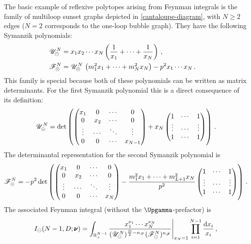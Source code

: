 \documentclass[12pt,a4paper]{article}
\theoremstyle{plain}
\theoremstyle{remark}
\newcommand{\fp}{x}
\newcommand{\nprops}{N}
\newcommand{\dd}{\mathrm{d}}
\newcommand{\cU}{\mathscr {U}}
\newcommand{\cF}{\mathscr {F}}
\newcommand{\undernotation}[1]{\pmb{#1}}
\begin{document}
		
		The basic example of reflexive polytopes arising from
        Feynman integrals is the family of multiloop sunset graphs
        depicted in \cref{cantaloupe-diagram}, with $\nprops \ge 2$ edges ($\nprops=2$ corresponds to the one-loop bubble graph).
        They have the following Symanzik polynomials:
		\begin{align}
			\cU^{\nprops}_{\circleddash}&=\fp_1 \fp_2 \cdots \fp_{\nprops} \left(\frac {1}{\fp_1}+\dots + \frac {1}{\fp_{\nprops}}\right)\, ,\cr
			\cF^{\nprops}_{\circleddash}&= 	\cU^{\nprops}_{\circleddash}\,\left(m_1^2 \fp_1 + \dots + m_{\nprops}^2 \fp_{\nprops} \right) - p^2\fp_1 \cdots \fp_{\nprops}\,.\label{secondSymanzik-banana}
		\end{align}
%
This family is special because both of these polynomials can be written as matrix determinants.
For the first Symanzik polynomial this is a direct
consequence of its definition:
\begin{equation}
  \cU^{\nprops}_{\circleddash}= \det\left(
    \begin{pmatrix}
      x_1&0&\cdots&0\cr
      0&x_2&\cdots&0\cr
      \vdots&\cdots&\ddots&\vdots\cr
      0&0&\cdots &x_{\nprops-1}
    \end{pmatrix}
        + x_{\nprops}
      \begin{pmatrix}
        1&\cdots& 1\cr
        \vdots&\cdots&\vdots\cr
        1&\cdots& 1
      \end{pmatrix}
\right)\,.
\end{equation}
The determinantal representation for the second Symanzik polynomial is
\begin{equation}
  \cF^{\nprops}_{\circleddash}= - p^2\det\left(\begin{pmatrix}
      x_1&0&\cdots&0\cr
      0&x_2&\cdots&0\cr
      \vdots&\cdots&\ddots&\vdots\cr
      0&0&\cdots &x_{\nprops}
    \end{pmatrix}-
    {m_1^2x_1+\cdots+m_{L+1}^2x_{\nprops}\over p^2}
      \begin{pmatrix}
        1&\cdots& 1\cr
        \vdots&\cdots&\vdots\cr
        1&\cdots& 1
      \end{pmatrix}\right) \, .
  \end{equation}
               The associated Feynman integral (without the $\Upgamma$-prefactor)
                is
                \begin{equation}
                   I_{\circleddash}(\nprops-1,D;\undernotation{\nu})= \int_{\mathbb R_+^{N-1}} {x_1^{\nu_1}\cdots
                    x_{\nprops}^{\nu_{\nprops}}\over
                    (\cU^\nprops_{\circleddash})^{{D\over2}-n_\cF}
                    (\cF^\nprops_{\circleddash})^{n_\cF}                  }\Bigg|_{x_{\nprops}=1}
                  \prod_{i=1}^{\nprops-1}{\dd x_i\over x_i}\,,
                \end{equation}
\end{document}
